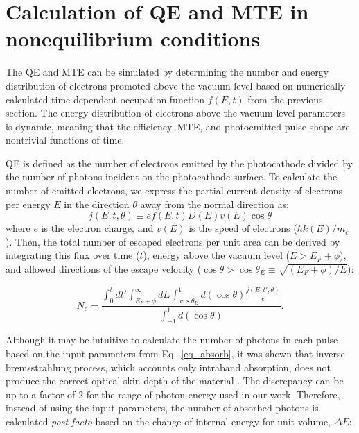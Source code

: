 \section{Calculation of QE and MTE in nonequilibrium conditions} 

The QE and MTE can be simulated by determining the number and energy distribution of electrons promoted above the vacuum level based on numerically calculated time dependent occupation function $f(E,t)$ from the previous section. The energy distribution of electrons above the vacuum level parameters is dynamic, meaning that the efficiency, MTE, and photoemitted pulse shape are nontrivial functions of time.

QE is defined as the number of electrons emitted by the photocathode divided by the number of photons incident on the photocathode surface. To calculate the number of emitted electrons, we express the partial current density of electrons per energy $E$ in the direction $\theta$ away from the normal direction as:
\begin{equation}
	j(E,t,\theta) \equiv e f(E,t) D(E) v(E) \cos\theta 
\end{equation}
where $e$ is the electron charge, and $v(E)$ is the speed of electrons ($\hbar k(E) / m_e$).
Then,  the total number of escaped electrons per unit area can be derived by integrating  this flux over time ($t$), energy above the vacuum level ($E > E_F + \phi$), and allowed directions of the escape velocity ($\cos \theta > \cos\theta_E \equiv \sqrt{(E_F + \phi)/E}$):\cite{dowell2009_QuantumEfficiencyThermal}

	\begin{equation}\label{eq_Ne}
		N_e = \frac{\displaystyle \int_0^t dt' \int_{E_F+\phi}^\infty dE \int^1_{\cos\theta_E} d(\cos\theta) \frac{j(E,t',\theta)}{e}}{\displaystyle \int^1_{-1}d(\cos\theta)}.
	\end{equation}


Although it may be intuitive to calculate the number of photons in each pulse based on the input parameters from Eq.~\ref{eq_absorb}, it was shown that inverse bremsstrahlung process, which accounts only intraband absorption, does not produce the correct optical skin depth of the material \cite{skin}. The discrepancy can be up to a factor of 2 for the range of photon energy used in our work. Therefore, instead of using the input parameters, the number of absorbed photons is calculated \emph{post-facto} based on the change of internal energy for unit volume, $\Delta E$:

